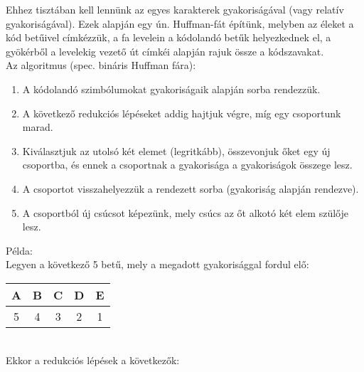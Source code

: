\documentclass[margin=0px]{article}
\begin{document}
			Ehhez tisztában kell lennünk az egyes karakterek gyakoriságával (vagy relatív gyakoriságával). Ezek alapján  egy ún. Huffman-fát építünk, melyben az éleket a kód betűivel címkézzük, a fa levelein a kódolandó betűk helyezkednek el, a gyökérből a levelekig vezető út címkéi alapján rajuk össze a kódszavakat.\\
			
			\noindent
			Az algoritmus (spec. bináris Huffman fára):
			\begin{enumerate}
				\item A kódolandó szimbólumokat gyakoriságaik alapján sorba rendezzük.
				\item A következő redukciós lépéseket addig hajtjuk végre, míg egy csoportunk marad.
				\item Kiválasztjuk az utolsó két elemet (legritkább), összevonjuk őket egy új csoportba, és ennek a csoportnak a gyakorisága a gyakoriságok összege lesz.
				\item A csoportot visszahelyezzük a rendezett sorba (gyakoriság alapján rendezve).
				\item A csoportból új csúcsot képezünk, mely csúcs az őt alkotó két elem szülője lesz. 
			\end{enumerate}
			
			\noindent
			Példa:\\
			Legyen a következő 5 betű, mely a megadott gyakorisággal fordul elő:\\
			
			\begin{tabular}{|c|c|c|c|c|}
				\hline A & B & C & D & E \\ 
				\hline 5 & 4 & 3 & 2 & 1 \\ 
				\hline 
			\end{tabular}\\
			
			 Ekkor a redukciós lépések a következők:
			 
\end{document}
